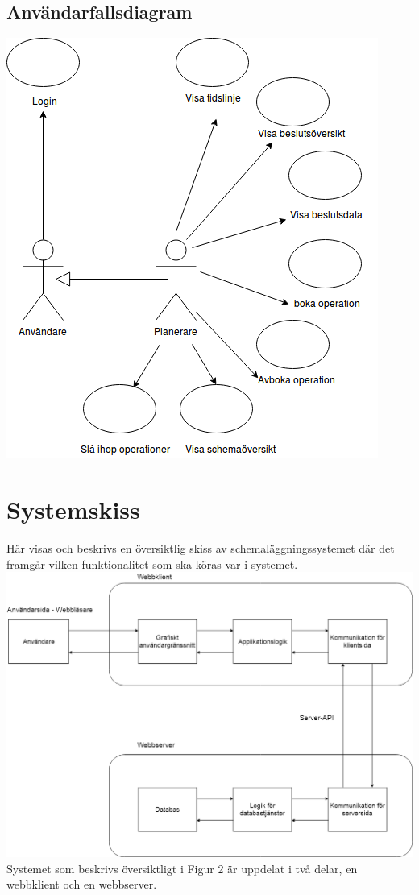\documentclass[a4paper,10pt]{article}
\begin{document}
\subsection{Användarfallsdiagram}
\includegraphics[width=\textwidth,height=\textheight,keepaspectratio]{Usecasediagram.png}
\clearpage
\section{Systemskiss}
\label{sec:Systemskiss}
Här visas och beskrivs en översiktlig skiss av schemaläggningssystemet där det framgår vilken funktionalitet som ska köras var i systemet. \\
\includegraphics[width=.9\linewidth,height=.7\textheight]{Systemskiss.png}
\\
Systemet som beskrivs översiktligt i Figur 2 är uppdelat i två delar, en webbklient och en webbserver.
\end{document}
